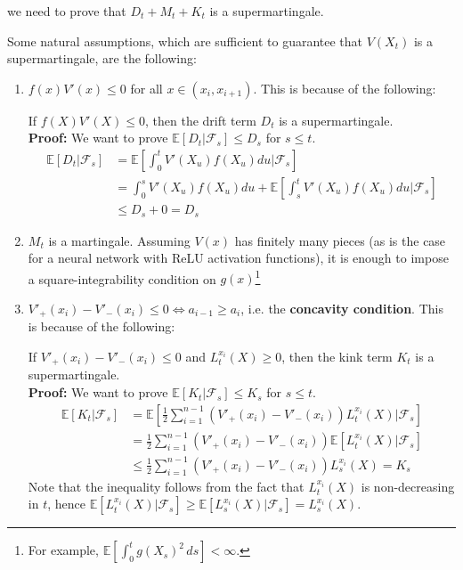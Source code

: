 we need to prove that $D_t + M_t + K_t$ is a supermartingale.

Some natural assumptions, which are sufficient to guarantee that $V(X_t)$ is a supermartingale, are the following:
\begin{enumerate}
  \item $f(x) V'(x) \leq 0$ for all $x \in (x_i, x_{i+1})$. This is because of the following:
  
  \begin{fact}
  \label{fact:nonpositive-drift-supermartingale}
  If $f(X) V'(X) \leq 0$, then the drift term $D_t$ is a supermartingale. \\
  \linebreak
  \textbf{Proof:} We want to prove $\mathbb{E}[D_t | \mathcal{F}_s] \leq D_s$ for $s \leq t$.
  \begin{align}
    \mathbb{E}[D_t | \mathcal{F}_s] &= \mathbb{E}\left[\int_0^t V'(X_u) f(X_u) du \Big| \mathcal{F}_s\right] \\
    &= \int_0^s V'(X_u) f(X_u) du + \mathbb{E}\left[\int_s^t V'(X_u) f(X_u) du \Big| \mathcal{F}_s\right] \\
    &\leq D_s + 0 = D_s
  \end{align}
  \end{fact}

  \item $M_t$ is a martingale. Assuming $V(x)$ has finitely many pieces
  (as is the case for a neural network with ReLU activation functions), it is enough
  to impose a square-integrability condition on $g(x)$\footnote{For example,
  $\mathbb{E}\!\left[\int_0^t g(X_s)^2\,ds\right]<\infty$.}
  
  \item $V'_{+}(x_i) - V'_{-}(x_i) \leq 0 \iff a_{i-1} \geq a_i$, i.e. the \textbf{concavity condition}. This is because of the following:
  \begin{fact}
    If $V'_{+}(x_i) - V'_{-}(x_i) \leq 0$ and $L_t^{x_i}(X) \geq 0$, then the kink term $K_t$ is a supermartingale. \\
    \linebreak
    \textbf{Proof:} We want to prove $\mathbb{E}[K_t | \mathcal{F}_s] \leq K_s$ for $s \leq t$.
    \begin{align}
      \mathbb{E}[K_t | \mathcal{F}_s] &= \mathbb{E}\left[\frac{1}{2} \sum_{i=1}^{n-1} \left( V'_{+}(x_i) - V'_{
-}(x_i) \right) L_t^{x_i}(X) \Big| \mathcal{F}_s\right] \\
      &= \frac{1}{2} \sum_{i=1}^{n-1} \left( V'_{+}(x_i) - V'_{-}(x_i) \right) \mathbb{E}\left[L_t^{x_i}(X) | \mathcal{F}_s\right] \\
      &\leq \frac{1}{2} \sum_{i=1}^{n-1} \left( V'_{+}(x_i) - V'_{-}(x_i) \right) L_s^{x_i}(X) = K_s
    \end{align}
    Note that the inequality follows from the fact that $L_t^{x_i}(X)$ is non-decreasing in $t$, hence $\mathbb{E}\left[L_t^{x_i}(X) | \mathcal{F}_s\right] \geq \mathbb{E}\left[L_s^{x_i}(X) | \mathcal{F}_s\right] = L_s^{x_i}(X)$.
  \end{fact}

\end{enumerate}

